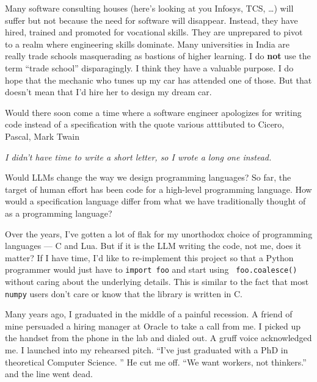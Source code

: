 \documentclass[letterpaper,12pt]{article}
\begin{document}
\item Many software consulting houses 
  (here's looking at you Infosys, TCS, \ldots) will suffer but not because 
  the need for software will disappear. 
  Instead, they have hired, trained and promoted for vocational skills. 
  They are unprepared to pivot to a realm where engineering skills dominate.
  Many universities in India are really trade schools masquerading as 
  bastions of higher learning.  I do {\bf not} use the term ``trade school''
  disparagingly.  I think they have a valuable purpose. 
  I do hope that the mechanic who tunes up my car has attended
  one of those. But that doesn't mean that I'd hire her to design my dream car. 

\item Would there soon come a time where a software engineer 
  apologizes for writing code instead of a specification with the quote various
  atttibuted to Cicero, Pascal, Mark Twain
\begin{center}
  {\em I didn't have time to write a short letter, so I wrote a 
  long one instead.}
  \end{center}

\item Would LLMs change the way we design programming languages? 
So far, the target of human effort has been code for a high-level 
programming language. How would a specification language differ from 
what we have traditionally thought of as a programming language?

\item Over the years, I've gotten a lot of flak for my unorthodox choice of
  programming languages --- C and Lua. But if it is the LLM writing the code,
  not me, does it matter? 
  If I have time, I'd like to re-implement this project so that a 
  Python programmer would just have to {\tt import foo} and start using {\tt
  foo.coalesce()} without caring about the underlying details. This is similar
  to the fact that most {\tt numpy} users don't care or know that the library is
  written in C.

\item Many years ago, I graduated in the middle of a painful recession. A friend
  of mine persuaded a hiring manager at Oracle to take a call from me. I picked
  up the handset from the phone in the lab and dialed out. A gruff voice
  acknowledged me. I launched into my rehearsed pitch. ``I've just graduated
  with a PhD in theoretical Computer Science. '' He cut me off. ``We want
  workers, not thinkers.'' and the line went dead. 
\end{document}
